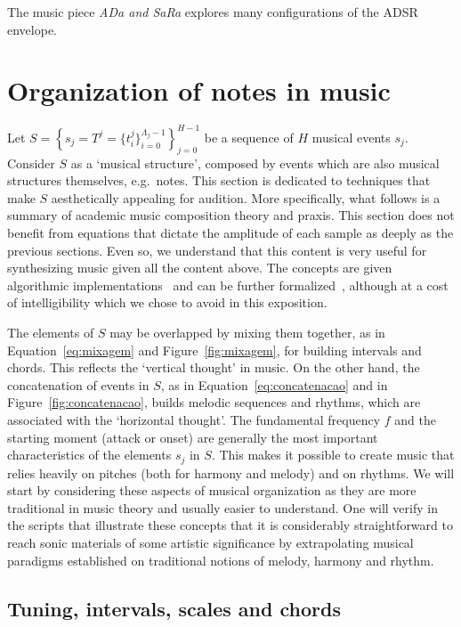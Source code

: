 The music piece \emph{ADa and SaRa} explores many configurations of the ADSR envelope.~\cite{MASSA}

\section{Organization of notes in music}\label{notasMusica} \label{sec:notesMusic}
Let $S=\left\{  s_j=T^j=\{t_i^j\}_{i=0}^{\Lambda_j-1} \right\}_{j=0}^{H-1}$ be a sequence of $H$ musical events $s_j$.
Consider $S$ as a `musical structure', composed by events which are also musical structures themselves, e.g.\ notes.
This section is dedicated to techniques that make $S$ aesthetically appealing for audition.
More specifically, what follows is a summary of academic music composition theory and praxis.
This section does not benefit from equations that dictate the amplitude of each sample as deeply as the previous sections.
Even so, we understand that this content is very useful for synthesizing music given all the content above.
The concepts are given algorithmic implementations~\cite{MASSA} and can be further formalized~\cite{topos},
although at a cost of intelligibility which we chose to avoid in this exposition.

The elements of $S$ may be overlapped by mixing them together, as in
Equation~\ref{eq:mixagem} and Figure~\ref{fig:mixagem}, for building intervals and chords.
This reflects the `vertical thought' in music. On the other hand, the concatenation of events
in $S$, as in Equation~\ref{eq:concatenacao} and in Figure~\ref{fig:concatenacao}, builds melodic sequences and rhythms, which are associated with the `horizontal thought'. The fundamental frequency $f$ and the starting moment
(attack or onset) are generally the most important characteristics of the elements $s_j$ in $S$.
This makes it possible to create music that relies heavily on pitches (both for harmony and melody) and on rhythms.
We will start by considering these aspects of musical organization as they are more traditional in music theory and usually easier to understand.
One will verify in the scripts that illustrate these concepts that it is considerably straightforward to
reach sonic materials of some artistic significance by
extrapolating musical paradigms established on traditional notions of melody, harmony and rhythm.

\subsection{Tuning, intervals, scales and chords}\label{subsec:afinacao}
